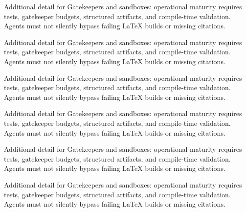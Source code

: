 Additional detail for Gatekeepers and sandboxes: operational maturity requires tests, gatekeeper budgets, structured artifacts, and compile-time validation. Agents must not silently bypass failing LaTeX builds or missing citations. \cite{crewai2024} \cite{langgraph2024} \cite{mcp2024}

Additional detail for Gatekeepers and sandboxes: operational maturity requires tests, gatekeeper budgets, structured artifacts, and compile-time validation. Agents must not silently bypass failing LaTeX builds or missing citations. \cite{crewai2024} \cite{langgraph2024} \cite{mcp2024}

Additional detail for Gatekeepers and sandboxes: operational maturity requires tests, gatekeeper budgets, structured artifacts, and compile-time validation. Agents must not silently bypass failing LaTeX builds or missing citations. \cite{crewai2024} \cite{langgraph2024} \cite{mcp2024}

Additional detail for Gatekeepers and sandboxes: operational maturity requires tests, gatekeeper budgets, structured artifacts, and compile-time validation. Agents must not silently bypass failing LaTeX builds or missing citations. \cite{crewai2024} \cite{langgraph2024} \cite{mcp2024}

Additional detail for Gatekeepers and sandboxes: operational maturity requires tests, gatekeeper budgets, structured artifacts, and compile-time validation. Agents must not silently bypass failing LaTeX builds or missing citations. \cite{crewai2024} \cite{langgraph2024} \cite{mcp2024}

Additional detail for Gatekeepers and sandboxes: operational maturity requires tests, gatekeeper budgets, structured artifacts, and compile-time validation. Agents must not silently bypass failing LaTeX builds or missing citations. \cite{crewai2024} \cite{langgraph2024} \cite{mcp2024}
